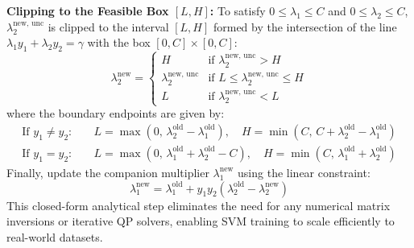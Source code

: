 \textbf{Clipping to the Feasible Box $[L, H]$:}
To satisfy $0 \le \lambda_1 \le C$ and $0 \le \lambda_2 \le C$, $\lambda_2^{\text{new, unc}}$ is clipped to the interval $[L, H]$ formed by the intersection of the line $\lambda_1 y_1 + \lambda_2 y_2 = \gamma$ with the box $[0, C] \times [0, C]$:
\begin{equation}
\lambda_2^{\text{new}} = \begin{cases} H & \text{if } \lambda_2^{\text{new, unc}} > H \\ \lambda_2^{\text{new, unc}} & \text{if } L \le \lambda_2^{\text{new, unc}} \le H \\ L & \text{if } \lambda_2^{\text{new, unc}} < L \end{cases}
\end{equation}
where the boundary endpoints are given by:
\begin{align}
\text{If } y_1 \ne y_2: & \quad L = \max\left(0, \, \lambda_2^{\text{old}} - \lambda_1^{\text{old}}\right), \quad H = \min\left(C, \, C + \lambda_2^{\text{old}} - \lambda_1^{\text{old}}\right) \\
\text{If } y_1 = y_2: & \quad L = \max\left(0, \, \lambda_1^{\text{old}} + \lambda_2^{\text{old}} - C\right), \quad H = \min\left(C, \, \lambda_1^{\text{old}} + \lambda_2^{\text{old}}\right)
\end{align}
Finally, update the companion multiplier $\lambda_1^{\text{new}}$ using the linear constraint:
\begin{equation}
\lambda_1^{\text{new}} = \lambda_1^{\text{old}} + y_1 y_2 \left( \lambda_2^{\text{old}} - \lambda_2^{\text{new}} \right)
\end{equation}
This closed-form analytical step eliminates the need for any numerical matrix inversions or iterative QP solvers, enabling SVM training to scale efficiently to real-world datasets.

